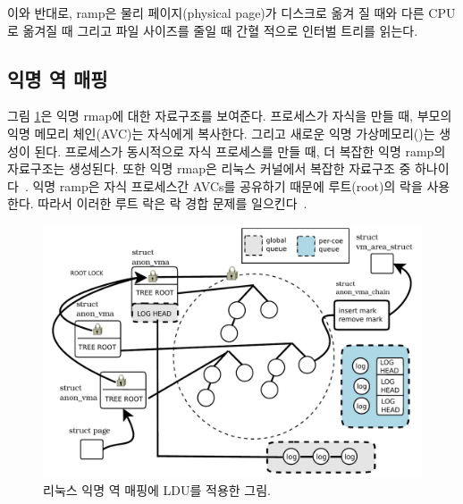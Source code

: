 이와 반대로, ramp은 물리 페이지(physical page)가 디스크로 옮겨 질 때와 다른 CPU로 옮겨질 때 그리고 
파일 사이즈를 줄일 때 간혈 적으로 인터벌 트리를 읽는다.

\subsection{익명 역 매핑}


그림 \ref{fig:anonvmaramp}은 익명 rmap에 대한 자료구조를 보여준다.
프로세스가 자식을 만들 때, 부모의 익명 메모리 체인(AVC)는 자식에게 복사한다. 
그리고 새로운 익명 가상메모리()는 생성이 된다.
프로세스가 동시적으로 자식 프로세스를 만들 때, 더 복잡한 익명 ramp의 자료구조는 생성된다.
또한 익명 rmap은 리눅스 커널에서 복잡한 자료구조 중 하나이다~\cite{CorbetLWNANON}.
익명 ramp은 자식 프로세스간 AVCs를 공유하기 때문에 루트(root)의 락을 사용한다.
따라서 이러한 루트 락은 락 경합 문제를 일으킨다~\cite{Andi2011adding}.  


\begin{figure}[tb]
  \begin{center}
     \includegraphics[width=1\textwidth,height=1\textheight,keepaspectratio]{fig/anon_vma}
  \end{center}
  \caption{리눅스 익명 역 매핑에 LDU를 적용한 그림.}
  \label{fig:anonvmaramp}
\end{figure}

